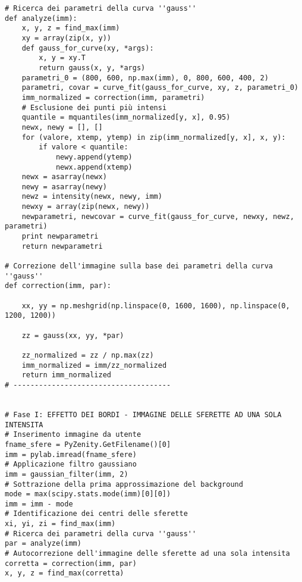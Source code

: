 \begin{lstlisting}
# Ricerca dei parametri della curva ''gauss''
def analyze(imm):
    x, y, z = find_max(imm)
    xy = array(zip(x, y))
    def gauss_for_curve(xy, *args):
        x, y = xy.T
        return gauss(x, y, *args)
    parametri_0 = (800, 600, np.max(imm), 0, 800, 600, 400, 2)
    parametri, covar = curve_fit(gauss_for_curve, xy, z, parametri_0)
    imm_normalized = correction(imm, parametri)
    # Esclusione dei punti più intensi
    quantile = mquantiles(imm_normalized[y, x], 0.95)
    newx, newy = [], []
    for (valore, xtemp, ytemp) in zip(imm_normalized[y, x], x, y):
        if valore < quantile:
            newy.append(ytemp) 
            newx.append(xtemp)
    newx = asarray(newx) 
    newy = asarray(newy)
    newz = intensity(newx, newy, imm)
    newxy = array(zip(newx, newy))
    newparametri, newcovar = curve_fit(gauss_for_curve, newxy, newz, parametri)
    print newparametri
    return newparametri

# Correzione dell'immagine sulla base dei parametri della curva ''gauss''
def correction(imm, par):

    xx, yy = np.meshgrid(np.linspace(0, 1600, 1600), np.linspace(0, 1200, 1200))
    
    zz = gauss(xx, yy, *par)
    
    zz_normalized = zz / np.max(zz)
    imm_normalized = imm/zz_normalized
    return imm_normalized 
# -------------------------------------


# Fase I: EFFETTO DEI BORDI - IMMAGINE DELLE SFERETTE AD UNA SOLA INTENSITA
# Inserimento immagine da utente
fname_sfere = PyZenity.GetFilename()[0]
imm = pylab.imread(fname_sfere)
# Applicazione filtro gaussiano
imm = gaussian_filter(imm, 2)
# Sottrazione della prima approssimazione del background
mode = max(scipy.stats.mode(imm)[0][0])
imm = imm - mode
# Identificazione dei centri delle sferette
xi, yi, zi = find_max(imm)
# Ricerca dei parametri della curva ''gauss''
par = analyze(imm)
# Autocorrezione dell'immagine delle sferette ad una sola intensita
corretta = correction(imm, par)
x, y, z = find_max(corretta)



\end{lstlisting}
